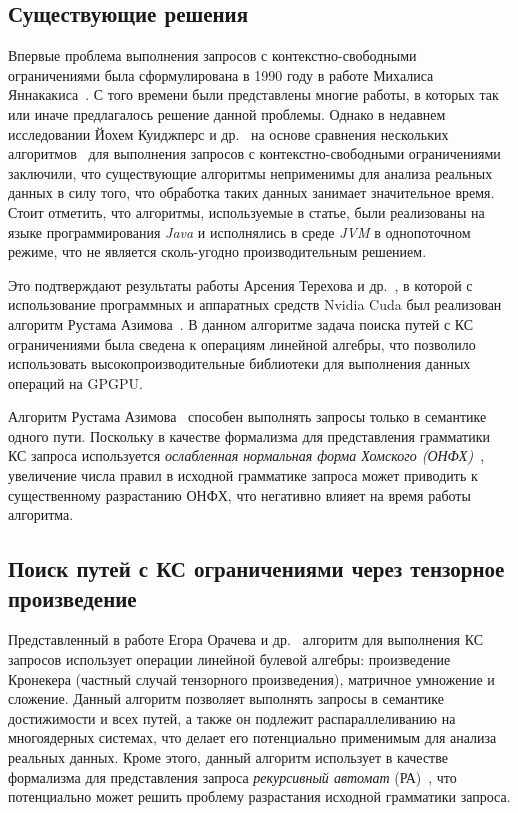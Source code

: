 \subsection{Существующие решения}

Впервые проблема выполнения запросов с контекстно-свободными ограничениями была сформулирована в 1990 году в работе Михалиса Яннакакиса~\cite{inproceedings:yannakakis_cfpq_problem}. С того времени были представлены многие работы, в которых так или иначе предлагалось решение данной проблемы. Однако в недавнем исследовании Йохем Куиджперс и др.~\cite{article:kuijpers_cfpq_exp_compare} на основе сравнения нескольких алгоритмов~\cite{article:hellings_cfpq,inproceedings:matrix_cfpq,inbook:santos_cfpq_lr_analysis} для выполнения запросов с контекстно-свободными ограничениями заключили, что существующие алгоритмы неприменимы для анализа реальных данных в силу того, что обработка таких данных занимает значительное время. Стоит отметить, что алгоритмы, используемые в статье, были реализованы на языке программирования \textit{Java} и исполнялись в среде \textit{JVM} в однопоточном режиме, что не является сколь-угодно производительным решением.

Это подтверждают результаты работы Арсения Терехова и др.~\cite{inproceedings:cfqp_matrix_with_single_source}, в которой с использование программных и аппаратных средств Nvidia Cuda был реализован алгоритм Рустама Азимова~\cite{inproceedings:matrix_cfpq}. В данном алгоритме задача поиска путей с КС ограничениями была сведена к операциям линейной алгебры, что позволило использовать высокопроизводительные библиотеки для выполнения данных операций на GPGPU.

Алгоритм Рустама Азимова~\cite{inproceedings:cfqp_matrix_with_single_source} способен выполнять запросы только в семантике одного пути. Поскольку в качестве формализма для представления грамматики КС запроса используется \textit{ослабленная нормальная форма Хомского (ОНФХ)}~\cite{book:automata_theory}, увеличение числа правил в исходной грамматике запроса может приводить к существенному разрастанию ОНФХ, что негативно влияет на время работы алгоритма.

\subsection{Поиск путей с КС ограничениями через тензорное произведение}

Представленный в работе Егора Орачева и др.~\cite{inbook:kronecker_cfpq_adbis} алгоритм для выполнения КС запросов использует операции линейной булевой алгебры: произведение Кронекера (частный случай тензорного произведения), матричное умножение и сложение. Данный алгоритм позволяет выполнять запросы в семантике достижимости и всех путей, а также он подлежит распараллеливанию на многоядерных системах, что делает его потенциально применимым для анализа реальных данных. Кроме этого, данный алгоритм использует в качестве формализма для представления запроса \textit{рекурсивный автомат} (РА)~\cite{article:recursive_state_machines}, что потенциально может решить проблему разрастания исходной грамматики запроса. 

